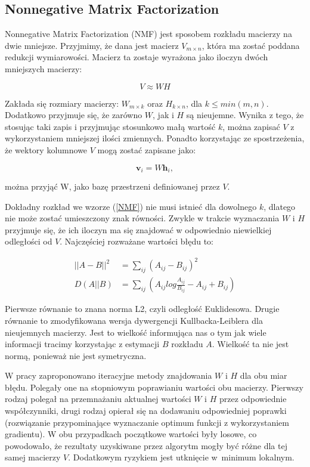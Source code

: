 \documentclass[oneside, eng]{mgr}
\newcommand{\bb}{\textbf}
\begin{document}
\subsection{Nonnegative Matrix Factorization}

Nonnegative Matrix Factorization (NMF) jest sposobem rozkładu macierzy na dwie mniejsze. Przyjmimy, że dana jest macierz $V_{m \times n}$, która ma zostać poddana redukcji wymiarowości. Macierz ta zostaje wyrażona jako iloczyn dwóch mniejszych macierzy:

\begin{equation}
	V \approx WH
\label{NMF}
\end{equation}

Zakłada się rozmiary macierzy: $W_{m \times k}$ oraz $H_{k \times n}$, dla $k \leq min(m,n)$. Dodatkowo przyjmuje się, że zarówno $W$, jak i $H$ są nieujemne. Wynika z tego, że stosując taki zapis i przyjmując stosunkowo małą wartość $k$, można zapisać $V$ z wykorzystaniem mniejszej ilości zmiennych. Ponadto korzystając ze spostrzeżenia, że wektory kolumnowe $V$ mogą zostać zapisane jako:

\begin{equation}
	\bb{v}_i = W \bb{h}_i,
\end{equation}

można przyjąć W, jako bazę przestrzeni definiowanej przez $V$.

Dokładny rozkład we wzorze (\ref{NMF}) nie musi istnieć dla dowolnego $k$, dlatego nie może zostać umieszczony znak równości. Zwykle w trakcie wyznaczania $W$ i $H$ przyjmuje się, że ich iloczyn ma się znajdować w odpowiednio niewielkiej odległości od $V$. Najczęściej rozważane wartości błędu to:

\begin{align*}
	||A - B||^2 &= \sum_{ij} (A_{ij} - B_{ij})^2 \\
	  D(A||B)   &= \sum_{ij} (A_{ij} log \frac{A_{ij}}{B_{ij}} - A_{ij} + B_{ij})
\end{align*}

Pierwsze równanie to znana norma L2, czyli odległość Euklidesowa. Drugie równanie to zmodyfikowana wersja dywergencji Kullbacka-Leiblera dla nieujemnych macierzy. Jest to wielkość informująca nas o tym jak wiele informacji tracimy korzystając z estymacji $B$ rozkładu $A$. Wielkość ta nie jest normą, ponieważ nie jest symetryczna.

W pracy \cite{NMF} zaproponowano iteracyjne metody znajdowania $W$ i $H$ dla obu miar błędu. Polegały one na stopniowym poprawianiu wartości obu macierzy. Pierwszy rodzaj polegał na przemnażaniu aktualnej wartości $W$ i $H$ przez odpowiednie współczynniki, drugi rodzaj opierał się na dodawaniu odpowiedniej poprawki (rozwiązanie przypominające wyznaczanie optimum funkcji z wykorzystaniem gradientu). W obu przypadkach początkowe wartości były losowe, co powodowało, że rezultaty uzyskiwane przez algorytm mogły być różne dla tej samej macierzy $V$. Dodatkowym ryzykiem jest utknięcie w~minimum lokalnym.
\end{document}
